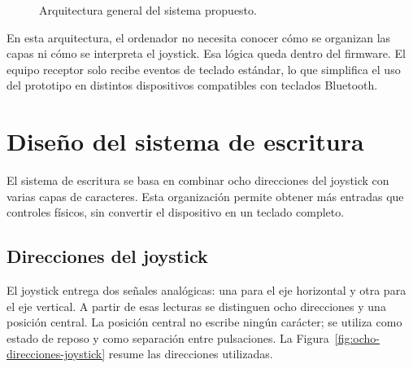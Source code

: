 \begin{figure}[H]
    \caption{Arquitectura general del sistema propuesto.}
    \label{fig:arquitectura-general-sistema}
\end{figure}En esta arquitectura, el ordenador no necesita conocer cómo se organizan las capas ni cómo se interpreta el joystick. Esa lógica queda dentro del firmware. El equipo receptor solo recibe eventos de teclado estándar, lo que simplifica el uso del prototipo en distintos dispositivos compatibles con teclados Bluetooth.

\section{Diseño del sistema de escritura}
\label{sec:diseno-escritura-nuevo}

El sistema de escritura se basa en combinar ocho direcciones del joystick con varias capas de caracteres. Esta organización permite obtener más entradas que controles físicos, sin convertir el dispositivo en un teclado completo.

\subsection{Direcciones del joystick}
\label{subsec:direcciones-joystick-nuevo}

El joystick entrega dos señales analógicas: una para el eje horizontal y otra para el eje vertical. A partir de esas lecturas se distinguen ocho direcciones y una posición central. La posición central no escribe ningún carácter; se utiliza como estado de reposo y como separación entre pulsaciones. La Figura~\ref{fig:ocho-direcciones-joystick} resume las direcciones utilizadas.

